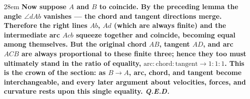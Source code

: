 \documentclass[border=4pt]{standalone}
\begin{document}
\begin{varwidth}{28em}
\large\bfseries
Now suppose $A$ and $B$ to coincide. By the preceding lemma the angle \textcolor{equalteal}{$\angle dAb$}      vanishes --- the chord and tangent directions merge. Therefore the right lines $Ab$, $Ad$ (which      are always finite) and the intermediate \textcolor{auxpurple}{arc $Acb$} squeeze together and      \textcolor{equalteal}{coincide, becoming equal among themselves}. But the original \textcolor{equalteal}{chord $AB$,      tangent $AD$, and arc $ACB$} are always proportional to these finite three; hence they too must      ultimately stand in the \textcolor{equalteal}{ratio of equality}, $\text{arc}:\text{chord}:\text{tangent}\to 1:1:1$.      This is the crown of the section: as $B\to A$, arc, chord, and tangent become interchangeable,      and every later argument about velocities, forces, and curvature rests upon this single equality.      \textit{Q.E.D.}
\end{varwidth}
\end{document}
